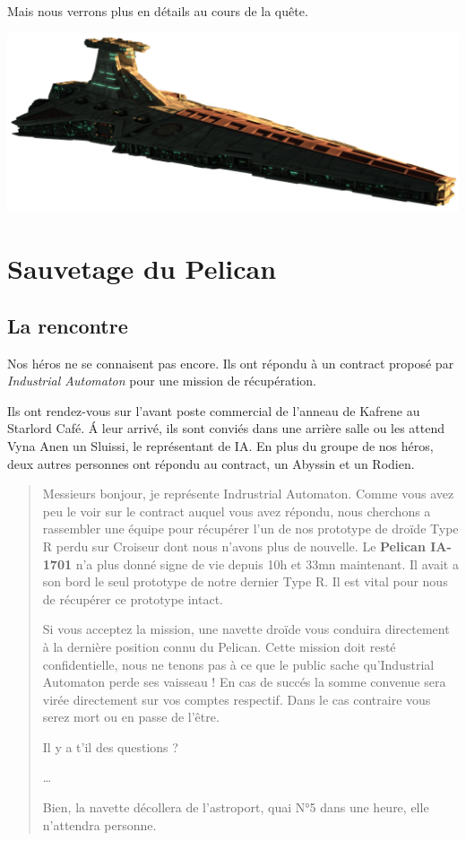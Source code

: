 \documentclass{jdrp}
\begin{document}
Mais nous verrons plus en détails au cours de la quête.

\vspace{-1\baselineskip}
\hspace{-0.4\columnsep}\includegraphics[width=\textwidth]{img/scenario/venator.png}
\vspace{-7\baselineskip}

\section{Sauvetage du Pelican}
\subsection{La rencontre}
Nos héros ne se connaisent pas encore. Ils ont répondu à un contract proposé par \emph{Industrial Automaton} pour une mission de récupération.

Ils ont rendez-vous sur l'avant poste commercial de l'anneau de Kafrene au Starlord Café. \'A leur arrivé, ils sont conviés dans une arrière salle ou les attend Vyna Anen un Sluissi, le représentant de IA. En plus du groupe de nos héros, deux autres personnes ont répondu au contract, un Abyssin et un Rodien.

\begin{quote}
	Messieurs bonjour, je représente Indrustrial Automaton.
	Comme vous avez peu le voir sur le contract auquel vous avez répondu, nous cherchons a rassembler une équipe pour récupérer l'un de nos prototype de droïde Type R perdu sur Croiseur dont nous n'avons plus de nouvelle.
	Le \textbf{Pelican IA-1701} n'a plus donné signe de vie depuis 10h et 33mn maintenant. Il avait a son bord le seul prototype de notre dernier Type R. Il est vital pour nous de récupérer ce prototype intact.

	Si vous acceptez la mission, une navette droïde vous conduira directement à la dernière position connu du Pelican. Cette mission doit resté confidentielle, nous ne tenons pas à ce que le public sache qu'Industrial Automaton perde ses vaisseau !
	En cas de succés la somme convenue sera virée directement sur vos comptes respectif. Dans le cas contraire vous serez mort ou en passe de l'être.

	Il y a t'il des questions ?

	\ldots

	Bien, la navette décollera de l'astroport, quai N°5 dans une heure, elle n'attendra personne.
\end{quote}
\end{document}

